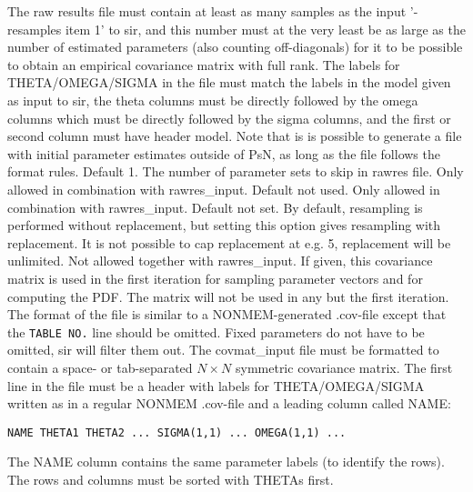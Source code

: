 \begin{optionlist}
The raw results file must contain at least as many 
samples as the input '-resamples item 1' to sir, and this number must at the very least
be as large as the number of estimated parameters (also counting off-diagonals)
for it to be possible to obtain an empirical covariance matrix with full rank.
The labels for  THETA/OMEGA/SIGMA 
in the file must match the labels in the model given as input 
to sir, the theta columns must be directly followed by the omega columns 
which must be directly followed by the sigma columns, and the first or
second column must have header model. Note that is is 
possible to generate a file with initial parameter estimates outside 
of PsN, as long as the file follows the format rules.
\nextopt
{}
Default 1. The number of parameter sets to skip in rawres file. Only allowed in combination with rawres\_input.
\nextopt
{}
Default not used. Only allowed in combination with rawres\_input.
\nextopt
{}
Default not set. By default, resampling is performed without replacement, but setting this option gives resampling with replacement.
It is not possible to cap replacement at e.g. 5, replacement will be unlimited.
\nextopt
{}
Not allowed together with rawres\_input. If given, this covariance matrix is
used in the first iteration
for sampling parameter vectors and for computing the PDF.
The matrix will not be used in any but the first iteration. 
The format of the file is similar to a NONMEM-generated .cov-file except 
that the \verb|TABLE NO.| line should be omitted.
Fixed parameters do not have to be omitted, sir will filter them out. 
The covmat\_input file must be formatted to contain a space- or tab-separated  $N\times N$ symmetric covariance matrix.
The first line in the file must be a header with labels for THETA/OMEGA/SIGMA written as in a regular NONMEM .cov-file 
and a leading column called NAME: 
\begin{verbatim}
NAME THETA1 THETA2 ... SIGMA(1,1) ... OMEGA(1,1) ... 
\end{verbatim}
The NAME column contains the same parameter labels (to identify the rows).
The rows and columns must be sorted with THETAs first.


\end{optionlist}
